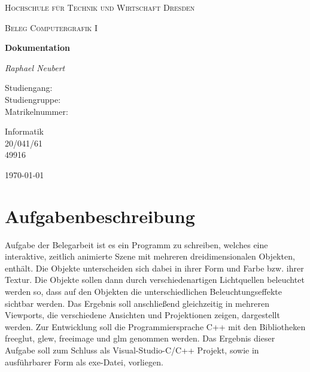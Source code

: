 \documentclass{article}
\begin{document}
\begin{titlepage}
    \centering
    {\scshape\LARGE Hochschule für Technik und Wirtschaft Dresden \par}
    \vspace{1cm}
    {\scshape\Large Beleg \glqq Computergrafik I\grqq\par}
    \vspace{1.5cm}
    {\huge\bfseries Dokumentation\par}
    \vspace{2cm}
    {\Large\itshape Raphael Neubert \par}
    \vfill
    \begin{minipage}{0.3\textwidth}
        Studiengang:\\
        Studiengruppe:\\
        Matrikelnummer:
    \end{minipage}
    \begin{minipage}{0.3\textwidth}
        Informatik\\
        20/041/61\\
        49916
    \end{minipage}
    \vfill

    {\large \today\par}
\end{titlepage}
\tableofcontents
\newpage

\section{Aufgabenbeschreibung}
Aufgabe der Belegarbeit ist es ein Programm zu schreiben, welches eine interaktive, zeitlich animierte Szene
mit mehreren dreidimensionalen Objekten, enthält. Die Objekte unterscheiden sich dabei in ihrer Form und Farbe
bzw. ihrer Textur. Die Objekte sollen dann durch verschiedenartigen Lichtquellen beleuchtet werden so, dass
auf den Objekten die unterschiedlichen Beleuchtungseffekte sichtbar werden. Das Ergebnis soll anschließend
gleichzeitig in mehreren Viewports, die verschiedene Ansichten und Projektionen zeigen, dargestellt werden.
Zur Entwicklung soll die Programmiersprache C++ mit den Bibliotheken freeglut, glew, freeimage und glm genommen werden.
Das Ergebnis dieser Aufgabe soll zum Schluss als Visual-Studio-C/C++ Projekt, sowie in ausführbarer Form
als exe-Datei, vorliegen.
\end{document}
